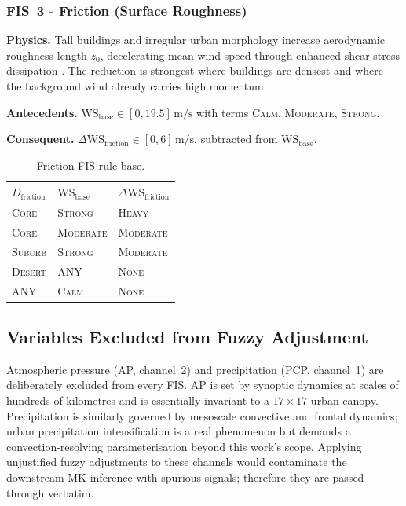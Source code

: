 \documentclass[conference]{IEEEtran}
\begin{document}
\subsubsection{FIS~3 - Friction (Surface Roughness)}

\textbf{Physics.}  Tall buildings and irregular urban morphology increase
aerodynamic roughness length \(z_0\), decelerating mean wind speed
through enhanced shear-stress dissipation
\cite{blocken2016computational}.  The reduction is strongest where
buildings are densest and where the background wind already carries high
momentum.

\textbf{Antecedents.}  \(\mathrm{WS}_{\mathrm{base}}\in[0,19.5]\,\mathrm{m/s}\) with
terms \textsc{Calm}, \textsc{Moderate}, \textsc{Strong}.

\textbf{Consequent.}
\(\Delta\mathrm{WS}_{\mathrm{friction}}\in[0,6]\,\mathrm{m/s}\),
subtracted from \(\mathrm{WS}_{\mathrm{base}}\).

\begin{table}[!h]
\centering
\caption{Friction FIS rule base.}
\label{tab:rules_friction}
\small
\begin{tabular}{@{}lll@{}}
  \toprule
  \(D_{\mathrm{friction}}\) & \(\mathrm{WS}_{\mathrm{base}}\) & \(\Delta\mathrm{WS}_{\mathrm{friction}}\) \\
  \midrule
  \textsc{Core}   & \textsc{Strong}   & \textsc{Heavy}    \\
  \textsc{Core}   & \textsc{Moderate} & \textsc{Moderate} \\
  \textsc{Suburb} & \textsc{Strong}   & \textsc{Moderate} \\
  \textsc{Desert} & ANY               & \textsc{None}     \\
  ANY             & \textsc{Calm}     & \textsc{None}     \\
  \bottomrule
\end{tabular}
\end{table}

\subsection{Variables Excluded from Fuzzy Adjustment}
\label{sec:excluded}

Atmospheric pressure (AP, channel~2) and precipitation (PCP, channel~1)
are deliberately excluded from every FIS.  AP is set by synoptic
dynamics at scales of hundreds of kilometres and is essentially invariant
to a \(17\times 17\) urban canopy.  Precipitation is similarly governed
by mesoscale convective and frontal dynamics; urban precipitation
intensification is a real phenomenon
\cite{han2014urbanisation} but demands a convection-resolving
parameterisation beyond this work's scope.  Applying unjustified fuzzy
adjustments to these channels would contaminate the downstream MK
inference with spurious signals; therefore they are passed through
verbatim.
\end{document}
